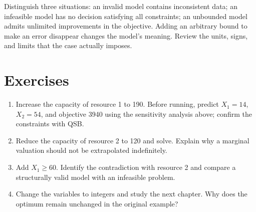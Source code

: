 Distinguish three situations: an invalid model contains inconsistent data;
an infeasible model has no decision satisfying all constraints; an unbounded
model admits unlimited improvements in the objective. Adding an arbitrary
bound to make an error disappear changes the model's meaning. Review the
units, signs, and limits that the case actually imposes.

\section{Exercises}
\begin{enumerate}
 \item Increase the capacity of resource 1 to 190. Before running, predict
 \(X_1=14\), \(X_2=54\), and objective 3940 using the sensitivity analysis above;
 confirm the constraints with QSB.
 \item Reduce the capacity of resource 2 to 120 and solve. Explain why a
 marginal valuation should not be extrapolated indefinitely.
 \item Add \(X_1\geq60\). Identify the contradiction with resource 2 and
 compare a structurally valid model with an infeasible problem.
 \item Change the variables to integers and study the next chapter.
 Why does the optimum remain unchanged in the original example?
\end{enumerate}
